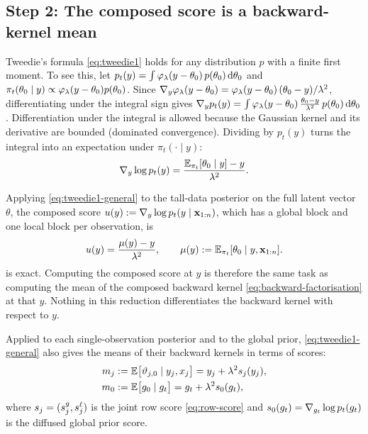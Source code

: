 \subsection{Step 2: The composed score is a backward-kernel mean}\label{sec:composed-tweedie}

Tweedie's formula \cref{eq:tweedie1} holds for any distribution $p$ with a finite first moment.
To see this, let $p_t(y)=\int\varphi_\lambda(y-\theta_0)\,p(\theta_0)\,\mathrm{d}\theta_0$ and $\pi_t(\theta_0\mid y)\propto\varphi_\lambda(y-\theta_0)p(\theta_0)$.
Since $\nabla_y\varphi_\lambda(y-\theta_0)=\varphi_\lambda(y-\theta_0)\,(\theta_0-y)/\lambda^2$, differentiating under the integral sign gives
$\nabla_y p_t(y)=\int\varphi_\lambda(y-\theta_0)\,\tfrac{\theta_0-y}{\lambda^2}\,p(\theta_0)\,\mathrm{d}\theta_0$.
Differentiation under the integral is allowed because the Gaussian kernel and its derivative are bounded (dominated convergence).
Dividing by $p_t(y)$ turns the integral into an expectation under $\pi_t(\cdot\mid y)$:
\begin{equation}\label{eq:tweedie1-general}
  \nabla_y\log p_t(y)=\frac{\mathbb{E}_{\pi_t}[\theta_0\mid y]-y}{\lambda^2}.
\end{equation}

Applying \cref{eq:tweedie1-general} to the tall-data posterior on the full latent vector $\theta$, the composed score $u(y):=\nabla_y\log p_t(y\mid\mathbf{x}_{1:n})$, which has a global block and one local block per observation, is
\begin{equation}\label{eq:composed-tweedie}
  u(y)=\frac{\mu(y)-y}{\lambda^2},\qquad\mu(y):=\mathbb{E}_{\pi_t}[\theta_0\mid y,\mathbf{x}_{1:n}].
\end{equation}
 is exact.
Computing the composed score at $y$ is therefore the same task as computing the mean of the composed backward kernel \cref{eq:backward-factorisation} at that $y$.
Nothing in this reduction differentiates the backward kernel with respect to $y$.

Applied to each single-observation posterior and to the global prior, \cref{eq:tweedie1-general} also gives the means of their backward kernels in terms of scores:
\begin{equation}\label{eq:factor-means}
\begin{aligned}
  m_j&:=\mathbb{E}\big[\vartheta_{j,0}\mid y_j,x_j\big]=y_j+\lambda^2 s_j(y_j),\\
  m_0&:=\mathbb{E}\big[g_0\mid g_t\big]=g_t+\lambda^2 s_0(g_t),
\end{aligned}
\end{equation}
where $s_j=(s_j^{g},s_j^{\ell})$ is the joint row score \cref{eq:row-score} and $s_0(g_t)=\nabla_{g_t}\log p_t(g_t)$ is the diffused global prior score.

